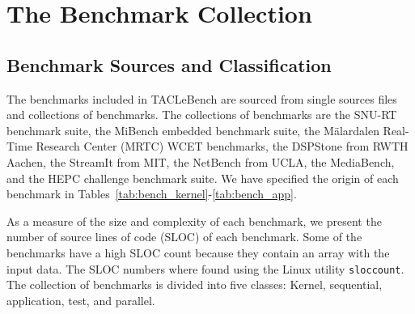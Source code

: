 \documentclass[a4paper,UKenglish]{oasics}
\newcommand{\todo}[1]{{\emph{TODO: #1}}}
\newcommand{\code}[1]{{\small{\texttt{#1}}}}
\begin{document}
\section{The Benchmark Collection}
\label{sec:collect}

\subsection{Benchmark Sources and Classification}

The benchmarks included in TACLeBench are sourced from single sources files and
collections of benchmarks.
The collections of benchmarks are the SNU-RT benchmark suite, the MiBench embedded benchmark suite, the M{\"a}lardalen Real-Time Research Center (MRTC) WCET benchmarks,
the DSPStone from RWTH Aachen, the StreamIt from MIT, the NetBench from UCLA, the MediaBench, and the HEPC challenge benchmark suite.
We have specified the origin of each benchmark in Tables~\ref{tab:bench_kernel}-\ref{tab:bench_app}.


As a measure of the size and complexity of each benchmark, we present the number of source lines of code (SLOC) of each benchmark.
Some of the benchmarks have a high SLOC count because they contain an array with the input data.
The SLOC numbers where found using the Linux utility \code{sloccount}.
The collection of benchmarks is divided into five classes: Kernel, sequential, application, test, and parallel.
\end{document}
